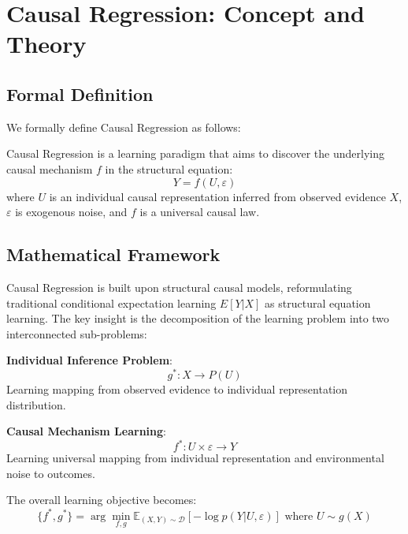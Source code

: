\documentclass[conference]{IEEEtran}
\newcommand{\expectation}{\mathbb{E}}
\begin{document}
\section{Causal Regression: Concept and Theory}
\label{sec:concept}

\subsection{Formal Definition}

We formally define Causal Regression as follows:

\begin{definition}
Causal Regression is a learning paradigm that aims to discover the underlying causal mechanism $f$ in the structural equation:
\begin{equation}
Y = f(U, \varepsilon)
\end{equation}
where $U$ is an individual causal representation inferred from observed evidence $X$, $\varepsilon$ is exogenous noise, and $f$ is a universal causal law.
\end{definition}

\subsection{Mathematical Framework}

Causal Regression is built upon structural causal models, reformulating traditional conditional expectation learning $E[Y|X]$ as structural equation learning. The key insight is the decomposition of the learning problem into two interconnected sub-problems:

\textbf{Individual Inference Problem}:
\begin{equation}
g^*: X \rightarrow P(U)
\end{equation}
Learning mapping from observed evidence to individual representation distribution.

\textbf{Causal Mechanism Learning}:
\begin{equation}
f^*: U \times \varepsilon \rightarrow Y  
\end{equation}
Learning universal mapping from individual representation and environmental noise to outcomes.

The overall learning objective becomes:
\begin{equation}
\{f^*, g^*\} = \arg\min_{f,g} \expectation_{(X,Y) \sim \mathcal{D}}[-\log p(Y|U,\varepsilon)] \text{ where } U \sim g(X)
\end{equation}
\end{document}
